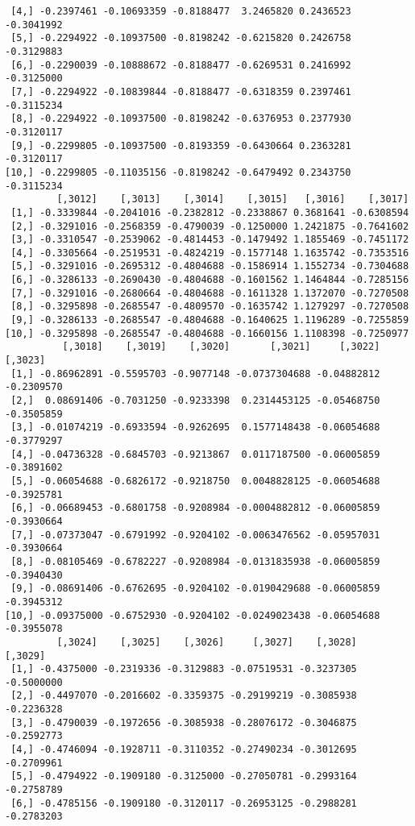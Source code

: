\documentclass[
  letterpaper,
  DIV=11,
  numbers=noendperiod]{scrreprt}
\begin{document}
\begin{verbatim}
 [4,] -0.2397461 -0.10693359 -0.8188477  3.2465820 0.2436523 -0.3041992
 [5,] -0.2294922 -0.10937500 -0.8198242 -0.6215820 0.2426758 -0.3129883
 [6,] -0.2290039 -0.10888672 -0.8188477 -0.6269531 0.2416992 -0.3125000
 [7,] -0.2294922 -0.10839844 -0.8188477 -0.6318359 0.2397461 -0.3115234
 [8,] -0.2294922 -0.10937500 -0.8198242 -0.6376953 0.2377930 -0.3120117
 [9,] -0.2299805 -0.10937500 -0.8193359 -0.6430664 0.2363281 -0.3120117
[10,] -0.2299805 -0.11035156 -0.8198242 -0.6479492 0.2343750 -0.3115234
         [,3012]    [,3013]    [,3014]    [,3015]   [,3016]    [,3017]
 [1,] -0.3339844 -0.2041016 -0.2382812 -0.2338867 0.3681641 -0.6308594
 [2,] -0.3291016 -0.2568359 -0.4790039 -0.1250000 1.2421875 -0.7641602
 [3,] -0.3310547 -0.2539062 -0.4814453 -0.1479492 1.1855469 -0.7451172
 [4,] -0.3305664 -0.2519531 -0.4824219 -0.1577148 1.1635742 -0.7353516
 [5,] -0.3291016 -0.2695312 -0.4804688 -0.1586914 1.1552734 -0.7304688
 [6,] -0.3286133 -0.2690430 -0.4804688 -0.1601562 1.1464844 -0.7285156
 [7,] -0.3291016 -0.2680664 -0.4804688 -0.1611328 1.1372070 -0.7270508
 [8,] -0.3295898 -0.2685547 -0.4809570 -0.1635742 1.1279297 -0.7270508
 [9,] -0.3286133 -0.2685547 -0.4804688 -0.1640625 1.1196289 -0.7255859
[10,] -0.3295898 -0.2685547 -0.4804688 -0.1660156 1.1108398 -0.7250977
          [,3018]    [,3019]    [,3020]       [,3021]     [,3022]    [,3023]
 [1,] -0.86962891 -0.5595703 -0.9077148 -0.0737304688 -0.04882812 -0.2309570
 [2,]  0.08691406 -0.7031250 -0.9233398  0.2314453125 -0.05468750 -0.3505859
 [3,] -0.01074219 -0.6933594 -0.9262695  0.1577148438 -0.06054688 -0.3779297
 [4,] -0.04736328 -0.6845703 -0.9213867  0.0117187500 -0.06005859 -0.3891602
 [5,] -0.06054688 -0.6826172 -0.9218750  0.0048828125 -0.06054688 -0.3925781
 [6,] -0.06689453 -0.6801758 -0.9208984 -0.0004882812 -0.06005859 -0.3930664
 [7,] -0.07373047 -0.6791992 -0.9204102 -0.0063476562 -0.05957031 -0.3930664
 [8,] -0.08105469 -0.6782227 -0.9208984 -0.0131835938 -0.06005859 -0.3940430
 [9,] -0.08691406 -0.6762695 -0.9204102 -0.0190429688 -0.06005859 -0.3945312
[10,] -0.09375000 -0.6752930 -0.9204102 -0.0249023438 -0.06054688 -0.3955078
         [,3024]    [,3025]    [,3026]     [,3027]    [,3028]    [,3029]
 [1,] -0.4375000 -0.2319336 -0.3129883 -0.07519531 -0.3237305 -0.5000000
 [2,] -0.4497070 -0.2016602 -0.3359375 -0.29199219 -0.3085938 -0.2236328
 [3,] -0.4790039 -0.1972656 -0.3085938 -0.28076172 -0.3046875 -0.2592773
 [4,] -0.4746094 -0.1928711 -0.3110352 -0.27490234 -0.3012695 -0.2709961
 [5,] -0.4794922 -0.1909180 -0.3125000 -0.27050781 -0.2993164 -0.2758789
 [6,] -0.4785156 -0.1909180 -0.3120117 -0.26953125 -0.2988281 -0.2783203

\end{verbatim}
\end{document}
